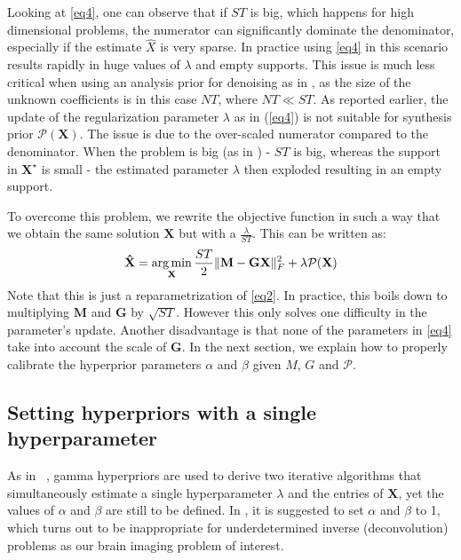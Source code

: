 Looking at \eqref{eq4}, one can observe that if $ST$ is big, which happens for high dimensional
problems, the numerator can significantly dominate the denominator, especially if
the estimate $\hat{X}$ is very sparse.
In practice using \eqref{eq4} in this scenario results rapidly in huge values of $\lambda$
and empty supports. This issue is much less critical when using an analysis prior
for denoising as in \cite{Figueiredo}, as the size of the unknown coefficients is
in this case $NT$, where $NT \ll ST$.
As reported earlier, the update of the regularization parameter $\lambda$ as in (\ref{eq4}) is not suitable for synthesis prior $\mathcal{P}(\mathbf{X})$. The issue is due to the over-scaled numerator compared to the denominator. When the problem is big (as in \cite{Figueiredo}) - $ST$ is big, whereas the support in $\mathbf{X}^\star$ is small - the estimated parameter $\lambda$ then exploded resulting in an empty support.

To overcome this problem, we rewrite the objective function in such a way that we obtain the same solution $\mathbf{X}$ but with a $\frac{\lambda}{ST}$. This can be written as:
\begin{equation} \label{eq5}
    \mathbf{\hat{X}} = \mathop{\mathrm{arg}\,\mathrm{min}}_{\mathbf{X}} \frac{ST}{2}\|\mathbf{M - GX}\|^2_{F} + \lambda\mathcal{P}(\mathbf{X})
\end{equation}
Note that this is just a reparametrization of \eqref{eq2}. In practice, this boils down to multiplying $\mathbf{M}$ and $\mathbf{G}$ by $\sqrt{ST}$. However this only solves one difficulty in the parameter's update. Another disadvantage is that none of the parameters in \eqref{eq4} take into account the scale of $\mathbf{G}$. In the next section, we explain how to properly calibrate the hyperprior parameters $\alpha$ and $\beta$ given $M$, $G$ and $\mathcal{P}$.

\subsection{Setting hyperpriors with a single hyperparameter}
As in ~\cite{Figueiredo}, gamma hyperpriors are used to derive two iterative algorithms that simultaneously estimate a single hyperparameter $\lambda$ and the entries of $\mathbf{X}$, yet the values of $\alpha$ and $\beta$ are still to be defined.
In \cite{Figueiredo}, it is suggested to set $\alpha$ and $\beta$ to 1, which turns out to be inappropriate for underdetermined inverse (deconvolution) problems as our brain imaging problem of interest.

